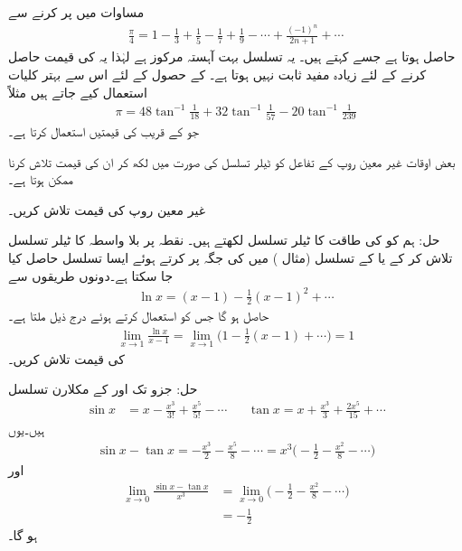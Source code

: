 مساوات  میں  پر کرنے سے
\begin{align*}
\frac{\pi}{4}=1-\frac{1}{3}+\frac{1}{5}-\frac{1}{7}+\frac{1}{9}-\cdots+\frac{(-1)^n}{2n+1}+\cdots
\end{align*}
حاصل ہوتا ہے جسے  کہتے ہیں۔ یہ تسلسل بہت آہستہ مرکوز ہے لہٰذا یہ  کی قیمت حاصل کرنے کے لئے زیادہ مفید ثابت نہیں ہوتا ہے۔  کے حصول کے لئے اس سے بہتر کلیات استعمال کیے جاتے ہیں مثلاً
\begin{align*}
\pi=48\tan^{-1}\frac{1}{18}+32\tan^{-1}\frac{1}{57}-20\tan^{-1}\frac{1}{239}
\end{align*}
جو  کے قریب  کی قیمتیں استعمال کرتا ہے۔ 

بعض اوقات غیر معین روپ کے تفاعل کو  ٹیلر تسلسل کی صورت میں لکھ کر ان کی قیمت تلاش کرنا ممکن ہوتا ہے۔

غیر معین روپ  کی قیمت تلاش کریں۔

  حل:\quad
ہم  کو  کی طاقت کا ٹیلر تسلسل لکھتے ہیں۔  نقطہ  پر بلا واسطہ  کا ٹیلر تسلسل  تلاش کر کے یا  کے تسلسل (مثال ) میں  کی جگہ  پر کرتے ہوئے ایسا تسلسل حاصل کیا جا سکتا ہے۔دونوں طریقوں سے
\begin{align*}
\ln x=(x-1)-\frac{1}{2}(x-1)^2+\cdots
\end{align*}
حاصل ہو گا جس کو استعمال کرتے ہوئے درج ذیل ملتا ہے۔
\begin{align*}
\lim_{x\to 1}\frac{\ln x}{x-1}=\lim_{x\to 1}\big(1-\frac{1}{2}(x-1)+\cdots \big)=1
\end{align*}
 کی قیمت تلاش کریں۔

حل:\quad
جزو  تک   اور  کے مکلارن تسلسل 
\begin{align*}
\sin x&=x-\frac{x^3}{3!}+\frac{x^5}{5!}-\cdots&& \tan x=x+\frac{x^3}{3}+\frac{2x^5}{15}+\cdots
\end{align*}
ہیں۔یوں
\begin{align*}
\sin x-\tan x=-\frac{x^3}{2}-\frac{x^5}{8}-\cdots=x^3\big(-\frac{1}{2}-\frac{x^2}{8}-\cdots\big)
\end{align*}
اور
\begin{align*}
\lim_{x\to 0}\frac{\sin x-\tan x}{x^3}&=\lim_{x\to 0}\big(-\frac{1}{2}-\frac{x^2}{8}-\cdots\big)\\
&=-\frac{1}{2}
\end{align*}
ہو گا۔


